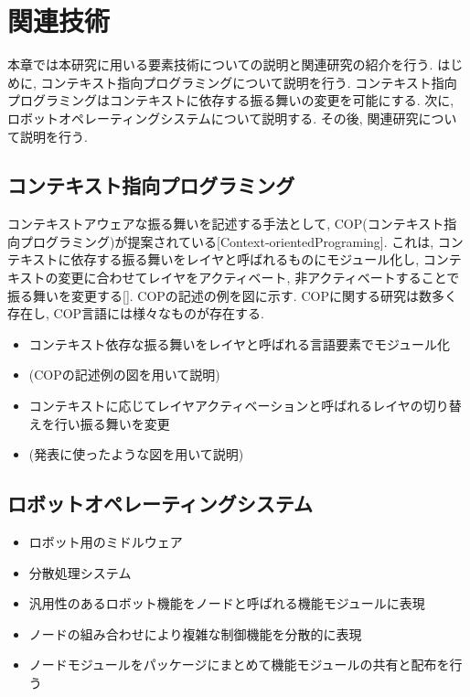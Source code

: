 
\chapter{関連技術}
\label{cha:related_work}
本章では本研究に用いる要素技術についての説明と関連研究の紹介を行う.
はじめに, コンテキスト指向プログラミングについて説明を行う. コンテキスト指向プログラミングはコンテキストに依存する振る舞いの変更を可能にする.
次に, ロボットオペレーティングシステムについて説明する.
その後, 関連研究について説明を行う.


\section{コンテキスト指向プログラミング}
コンテキストアウェアな振る舞いを記述する手法として, COP(コンテキスト指向プログラミング)が提案されている[Context-orientedPrograming]. これは, コンテキストに依存する振る舞いをレイヤと呼ばれるものにモジュール化し, コンテキストの変更に合わせてレイヤをアクティベート, 非アクティベートすることで振る舞いを変更する[]. COPの記述の例を図に示す. COPに関する研究は数多く存在し, COP言語には様々なものが存在する. 

\begin{itemize}
 \item コンテキスト依存な振る舞いをレイヤと呼ばれる言語要素でモジュール化
 \item (COPの記述例の図を用いて説明)
 \item コンテキストに応じてレイヤアクティベーションと呼ばれるレイヤの切り替えを行い振る舞いを変更
 \item (発表に使ったような図を用いて説明)
\end{itemize}




\section{ロボットオペレーティングシステム}

\begin{itemize}
 \item ロボット用のミドルウェア
 \item 分散処理システム
 \item 汎用性のあるロボット機能をノードと呼ばれる機能モジュールに表現
 \item ノードの組み合わせにより複雑な制御機能を分散的に表現
 \item ノードモジュールをパッケージにまとめて機能モジュールの共有と配布を行う
\end{itemize}

